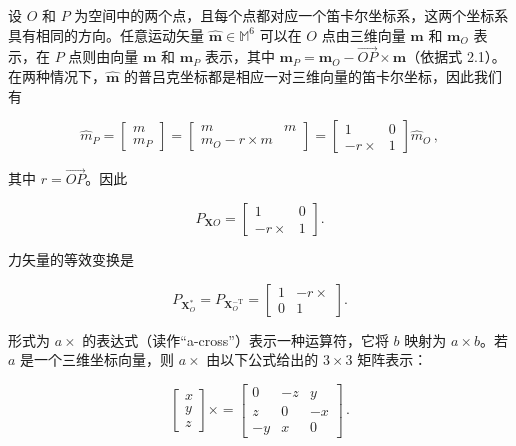 \documentclass[10pt,a4paper]{book}
\theoremstyle{thmstyle} %
\theoremstyle{defstyle} %
\theoremstyle{prostyle} %
\begin{document}
设 $O$ 和 $P$ 为空间中的两个点，且每个点都对应一个笛卡尔坐标系，这两个坐标系具有相同的方向。任意运动矢量 $\hat{\mathbf{m}} \in \mathbb{M}^{6}$ 可以在 $O$ 点由三维向量 $\mathbf{m}$ 和 $\mathbf{m}_{O}$ 表示，在 $P$ 点则由向量 $\mathbf{m}$ 和 $\mathbf{m}_{P}$ 表示，其中 $\mathbf{m}_{P} = \mathbf{m}_{O} - \overrightarrow{OP} \times \mathbf{m}$（依据式 2.1）。在两种情况下，$\hat{\mathbf{m}}$ 的普吕克坐标都是相应一对三维向量的笛卡尔坐标，因此我们有



$$
\hat { m } _ { P } = \left[ \begin{array}{l} { m } \\{ m _ { P } } \end{array} \right] = \left[ \begin{array}{ll} { m } & { m } \\{ m _ { O } - r \times m } \end{array} \right] = \left[ \begin{array}{ll} { 1 } & { 0 } \\{ - r \times } & { 1 } \end{array} \right] \hat { m } _ { O } \, ,
$$



其中 $r=\overrightarrow{OP}$。因此



$$
P _ { \mathbf { X } O } = \left[ \begin{array}{ll} { 1 } & { 0 } \\{ - r \times } & { 1 } \end{array} \right] .
$$



力矢量的等效变换是



$$
P _ { \mathbf { X } _ { O } ^{*} } = P _ { \mathbf { X } _ { O } ^{- \mathrm { T} } } = { \left[ \begin{array}{ll} { 1 } & { - r \times } \\{ 0 } & { 1 } \end{array} \right] } .
$$



形式为 $a\times$ 的表达式（读作“a-cross”）表示一种运算符，它将 $b$ 映射为 $a\times b$。若 $a$ 是一个三维坐标向量，则 $a\times$ 由以下公式给出的 $3\times3$ 矩阵表示：



$$
\left[ \begin{array}{l} { x } \\{ y } \\{ z } \end{array} \right] \times = \left[ \begin{array}{lll} { 0 } & { - z } & { y } \\{ z } & { 0 } & { - x } \\{ - y } & { x } & { 0 } \end{array} \right] \, .
$$
\end{document}
